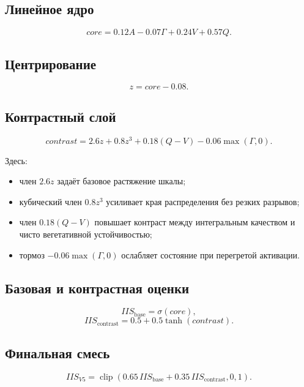 \documentclass[12pt,a4paper]{article}
\begin{document}
\subsection{Линейное ядро}
\begin{equation}
core=0.12A-0.07\Gamma+0.24V+0.57Q.
\end{equation}

\subsection{Центрирование}
\begin{equation}
z=core-0.08.
\end{equation}

\subsection{Контрастный слой}
\begin{equation}
contrast=
2.6z
+0.8z^3
+0.18(Q-V)
-0.06\max(\Gamma,0).
\end{equation}

Здесь:
\begin{itemize}[leftmargin=1.25cm]
    \item член $2.6z$ задаёт базовое растяжение шкалы;
    \item кубический член $0.8z^3$ усиливает края распределения без резких разрывов;
    \item член $0.18(Q-V)$ повышает контраст между интегральным качеством и чисто вегетативной устойчивостью;
    \item тормоз $-0.06\max(\Gamma,0)$ ослабляет состояние при перегретой активации.
\end{itemize}

\subsection{Базовая и контрастная оценки}
\begin{equation}
IIS_{\mathrm{base}}=\sigma(core),
\end{equation}
\begin{equation}
IIS_{\mathrm{contrast}}=0.5+0.5\tanh(contrast).
\end{equation}

\subsection{Финальная смесь}
\begin{equation}
IIS_{V5}=
\operatorname{clip}\!\left(
0.65\,IIS_{\mathrm{base}}+0.35\,IIS_{\mathrm{contrast}},
0,1
\right).
\end{equation}
\end{document}
